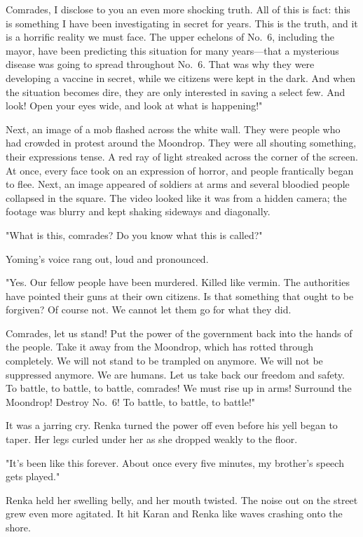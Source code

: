 Comrades, I disclose to you an even more shocking truth. All of this is
fact: this is something I have been investigating in secret for years.
This is the truth, and it is a horrific reality we must face. The upper
echelons of No.~6, including the mayor, have been predicting this
situation for many years---that a mysterious disease was going to spread
throughout No.~6. That was why they were developing a vaccine in secret,
while we citizens were kept in the dark. And when the situation becomes
dire, they are only interested in saving a select few. And look! Open
your eyes wide, and look at what is happening!"

Next, an image of a mob flashed across the white wall. They were people
who had crowded in protest around the Moondrop. They were all shouting
something, their expressions tense. A red ray of light streaked across
the corner of the screen. At once, every face took on an expression of
horror, and people frantically began to flee. Next, an image appeared of
soldiers at arms and several bloodied people collapsed in the square.
The video looked like it was from a hidden camera; the footage was
blurry and kept shaking sideways and diagonally.

"What is this, comrades? Do you know what this is called?"

Yoming's voice rang out, loud and pronounced.

"Yes. Our fellow people have been murdered. Killed like vermin. The
authorities have pointed their guns at their own citizens. Is that
something that ought to be forgiven? Of course not. We cannot let them
go for what they did.

Comrades, let us stand! Put the power of the government back into the
hands of the people. Take it away from the Moondrop, which has rotted
through completely. We will not stand to be trampled on anymore. We will
not be suppressed anymore. We are humans. Let us take back our freedom
and safety. To battle, to battle, to battle, comrades! We must rise up
in arms! Surround the Moondrop! Destroy No.~6! To battle, to battle, to
battle!"

It was a jarring cry. Renka turned the power off even before his yell
began to taper. Her legs curled under her as she dropped weakly to the
floor.

"It's been like this forever. About once every five minutes, my
brother's speech gets played."

Renka held her swelling belly, and her mouth twisted. The noise out on
the street grew even more agitated. It hit Karan and Renka like waves
crashing onto the shore.

